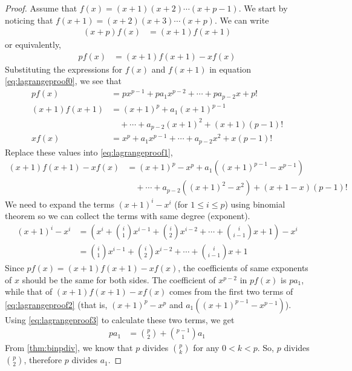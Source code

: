 	\begin{proof}[Proof]
		Assume that $f(x)=(x+1)(x+2)\cdots(x+p-1)$. We start by noticing that $f(x+1)  = (x+2) (x+3) \cdots (x+p)$. We can write
			\begin{align*}
				(x+p)f(x) &=(x+1)f(x+1)
			\end{align*}
		or equivalently,
			\begin{align}\label{eq:lagrangeproof1}
			 pf(x) &=(x+1)f(x+1)-xf(x)
			\end{align}
		Substituting the expressions for $f(x)$ and $f(x+1)$ in equation \eqref{eq:lagrangeproof0}, we see that
			\begin{align*}
				pf(x) & = px^{p-1}+pa_1x^{p-2}+\cdots+pa_{p-2}x+p!\\
				(x+1)f(x+1) & = (x+1)^p+a_1(x+1)^{p-1}\\ & \quad +\cdots+a_{p-2}(x+1)^2+(x+1)(p-1)!\\
				xf(x) & = x^p+a_1x^{p-1}+\cdots+a_{p-2}x^2+x(p-1)!
			\end{align*}
		Replace these values into \eqref{eq:lagrangeproof1},
			\begin{align}\label{eq:lagrangeproof2}
				(x+1)f(x+1)-xf(x)
					& = (x+1)^p-x^p+a_1((x+1)^{p-1}-x^{p-1}) \nonumber\\
					& \quad +\cdots+a_{p-2}((x+1)^2-x^2)+(x+1-x)(p-1)!
			\end{align}
		We need to expand the terms $(x+1)^i - x^i$ (for $1 \leq i \leq p$) using binomial theorem so we can collect the terms with same degree (exponent).
			\begin{align}\label{eq:lagrangeproof3}
				(x+1)^i-x^i
					& = \left(x^i+\binom{i}{1}x^{i-1} + \binom{i}{2} x^{i-2}+\cdots+ \binom{i}{i-1} x + 1\right)-x^i \nonumber\\
					& = \binom{i}{1}x^{i-1} + \binom{i}{2} x^{i-2}+\cdots+ \binom{i}{i-1} x + 1
			\end{align}
		Since $pf(x) = (x+1)f(x+1)-xf(x)$, the coefficients of same exponents of $x$ should be the same for both sides. The coefficient of $x^{p-2}$ in $pf(x)$ is $pa_1$, while that of $(x+1)f(x+1)-xf(x)$ comes from the first two terms of \eqref{eq:lagrangeproof2} (that is, $(x+1)^p-x^p$ and $a_1((x+1)^{p-1}-x^{p-1})$). Using \eqref{eq:lagrangeproof3} to calculate these two terms, we get
			\begin{align*}
				pa_1 & = \binom{p}{2}+\binom{p-1}{1}a_1
			\end{align*}
		From \autoref{thm:binpdiv}, we know that $p$ divides $\binom{p}{k}$ for any $0<k<p$. So, $p$ divides $\binom{p}{2}$, therefore $p$ divides $a_1$.


\end{proof}
